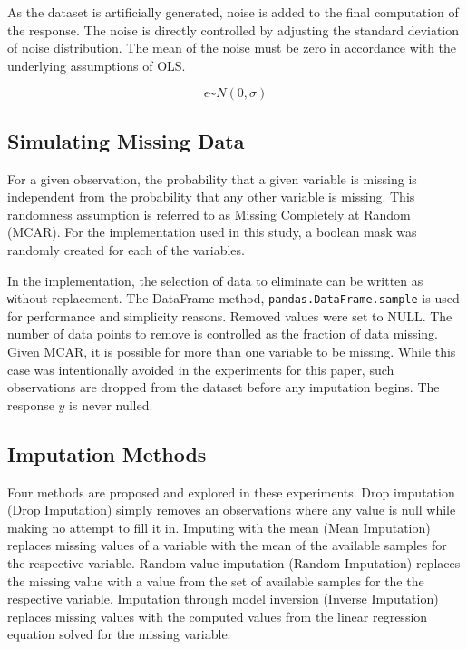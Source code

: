 \documentclass[../../paper.tex]{subfiles}
\begin{document}
As the dataset is artificially generated, noise is added to the final
computation of the response.
The noise is directly controlled by adjusting the standard deviation of noise distribution.
The mean of the noise must be zero in accordance with the underlying assumptions of OLS.


\begin{equation}\label{eq:epsilon_def}
  \epsilon \text{\textasciitilde} N(0, \sigma)
\end{equation}
%
%


\subsection{Simulating Missing Data}
For a given observation, the probability that a given variable is missing is
independent from the probability that any other variable is missing. This randomness
assumption is referred to as Missing Completely at Random (MCAR). For the implementation
used in this study, a boolean mask was randomly created for each
of the variables.

In the implementation, the selection of data to eliminate can be written as
\texttt without replacement.
The DataFrame method, \texttt{pandas.DataFrame.sample} is used for
performance and simplicity reasons. Removed values were set to NULL. The number of
data points to remove is controlled as the fraction of data missing. Given MCAR,
it is possible for more than one variable to be missing. While this case was intentionally avoided in the experiments for this paper, such observations are dropped from the dataset before any imputation begins.
The response $y$ is never nulled.


\subsection{Imputation Methods}

Four methods are proposed and explored in these experiments.
Drop imputation (Drop Imputation) simply removes an observations where any value is null while making no attempt to fill it in.
Imputing with the mean (Mean Imputation) replaces missing values of a variable with the mean of the available samples for the respective variable.
Random value imputation (Random Imputation) replaces the missing value with a value from the set of available samples for the the respective variable.
Imputation through model inversion (Inverse Imputation) replaces missing values with the computed values from the linear regression equation solved for the missing variable.
\end{document}
